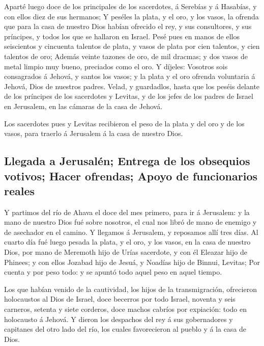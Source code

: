  Aparté luego doce de los principales de los sacerdotes, á
Serebías y á Hasabías, y con ellos diez de sus hermanos;  Y
peséles la plata, y el oro, y los vasos, la ofrenda que para la casa de
nuestro Dios habían ofrecido el rey, y sus consultores, y sus príncipes,
y todos los que se hallaron en Israel.  Pesé pues en manos
de ellos seiscientos y cincuenta talentos de plata, y vasos de plata por
cien talentos, y cien talentos de oro;  Además veinte
tazones de oro, de mil dracmas; y dos vasos de metal limpio muy bueno,
preciados como el oro.  Y díjeles: Vosotros sois
consagrados á Jehová, y santos los vasos; y la plata y el oro ofrenda
voluntaria á Jehová, Dios de nuestros padres.  Velad, y
guardadlos, hasta que los peséis delante de los príncipes de los
sacerdotes y Levitas, y de los jefes de los padres de Israel en
Jerusalem, en las cámaras de la casa de Jehová.

 Los sacerdotes pues y Levitas recibieron el peso de la
plata y del oro y de los vasos, para traerlo á Jerusalem á la casa de
nuestro Dios.

\hypertarget{llegada-a-jerusaluxe9n-entrega-de-los-obsequios-votivos-hacer-ofrendas-apoyo-de-funcionarios-reales}{%
\subsection{Llegada a Jerusalén; Entrega de los obsequios votivos; Hacer
ofrendas; Apoyo de funcionarios
reales}\label{llegada-a-jerusaluxe9n-entrega-de-los-obsequios-votivos-hacer-ofrendas-apoyo-de-funcionarios-reales}}

 Y partimos del río de Ahava el doce del mes primero, para
ir á Jerusalem: y la mano de nuestro Dios fué sobre nosotros, el cual
nos libró de mano de enemigo y de asechador en el camino. 
Y llegamos á Jerusalem, y reposamos allí tres días.  Al
cuarto día fué luego pesada la plata, y el oro, y los vasos, en la casa
de nuestro Dios, por mano de Meremoth hijo de Urías sacerdote, y con él
Eleazar hijo de Phinees; y con ellos Jozabad hijo de Jesuá, y Noadías
hijo de Binnui, Levitas;  Por cuenta y por peso todo: y se
apuntó todo aquel peso en aquel tiempo.

 Los que habían venido de la cautividad, los hijos de la
transmigración, ofrecieron holocaustos al Dios de Israel, doce becerros
por todo Israel, noventa y seis carneros, setenta y siete corderos, doce
machos cabríos por expiación: todo en holocausto á Jehová. 
Y dieron los despachos del rey á sus gobernadores y capitanes del otro
lado del río, los cuales favorecieron al pueblo y á la casa de Dios.

